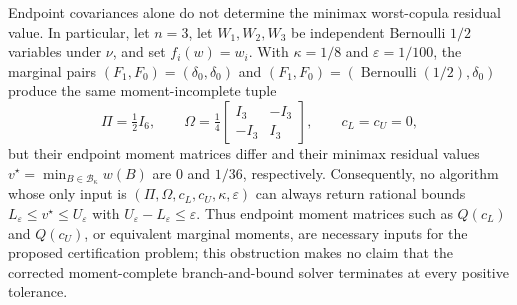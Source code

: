 Endpoint covariances alone do not determine the minimax worst-copula residual value.  In particular, let \(n=3\), let \(W_1,W_2,W_3\) be independent Bernoulli \(1/2\) variables under \(\nu\), and set \(f_i(w)=w_i\).  With \(\kappa=1/8\) and \(\varepsilon=1/100\), the marginal pairs \((F_1,F_0)=(\delta_0,\delta_0)\) and \((F_1,F_0)=(\operatorname{Bernoulli}(1/2),\delta_0)\) produce the same moment-incomplete tuple
\[
\Pi=\tfrac12 I_6,\qquad
\Omega=\tfrac14\begin{bmatrix}I_3&-I_3\\-I_3&I_3\end{bmatrix},
\qquad c_L=c_U=0,
\]
but their endpoint moment matrices differ and their minimax residual values \(v^\star=\min_{B\in\mathcal B_\kappa}w(B)\) are \(0\) and \(1/36\), respectively.  Consequently, no algorithm whose only input is \((\Pi,\Omega,c_L,c_U,\kappa,\varepsilon)\) can always return rational bounds \(L_{\varepsilon}\le v^\star\le U_{\varepsilon}\) with \(U_{\varepsilon}-L_{\varepsilon}\le\varepsilon\).  Thus endpoint moment matrices such as \(Q(c_L)\) and \(Q(c_U)\), or equivalent marginal moments, are necessary inputs for the proposed certification problem; this obstruction makes no claim that the corrected moment-complete branch-and-bound solver terminates at every positive tolerance.